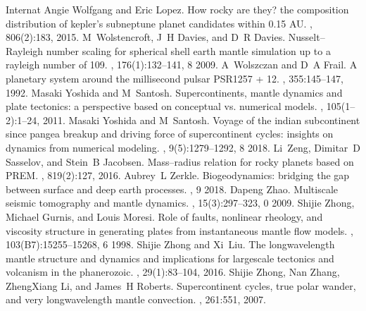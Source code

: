 \documentclass[letterpaper,10pt,english]{jupyterBook}
\begin{document}
\begin{sphinxthebibliography}{Internat}
\sphinxAtStartPar
Angie Wolfgang and Eric Lopez. How rocky are they? the composition distribution of kepler's sub\sphinxhyphen{}neptune planet candidates within 0.15 AU. , 806(2):183, 2015.
\sphinxAtStartPar
M Wolstencroft, J H Davies, and D R Davies. Nusselt–Rayleigh number scaling for spherical shell earth mantle simulation up to a rayleigh number of 109. , 176(1):132–141, 8 2009.
\sphinxAtStartPar
A Wolszczan and D A Frail. A planetary system around the millisecond pulsar PSR1257 + 12. , 355:145–147, 1992.
\sphinxAtStartPar
Masaki Yoshida and M Santosh. Supercontinents, mantle dynamics and plate tectonics: a perspective based on conceptual vs. numerical models. , 105(1–2):1–24, 2011.
\sphinxAtStartPar
Masaki Yoshida and M Santosh. Voyage of the indian subcontinent since pangea breakup and driving force of supercontinent cycles: insights on dynamics from numerical modeling. , 9(5):1279–1292, 8 2018.
\sphinxAtStartPar
Li Zeng, Dimitar D Sasselov, and Stein B Jacobsen. Mass–radius relation for rocky planets based on PREM. , 819(2):127, 2016.
\sphinxAtStartPar
Aubrey L Zerkle. Biogeodynamics: bridging the gap between surface and deep earth processes. , 9 2018.
\sphinxAtStartPar
Dapeng Zhao. Multiscale seismic tomography and mantle dynamics. , 15(3):297–323, 0 2009.
\sphinxAtStartPar
Shijie Zhong, Michael Gurnis, and Louis Moresi. Role of faults, nonlinear rheology, and viscosity structure in generating plates from instantaneous mantle flow models. , 103(B7):15255–15268, 6 1998.
\sphinxAtStartPar
Shijie Zhong and Xi Liu. The long\sphinxhyphen{}wavelength mantle structure and dynamics and implications for large\sphinxhyphen{}scale tectonics and volcanism in the phanerozoic. , 29(1):83–104, 2016.
\sphinxAtStartPar
Shijie Zhong, Nan Zhang, Zheng\sphinxhyphen{}Xiang Li, and James H Roberts. Supercontinent cycles, true polar wander, and very long\sphinxhyphen{}wavelength mantle convection. , 261:551, 2007.

\end{sphinxthebibliography}
\end{document}
